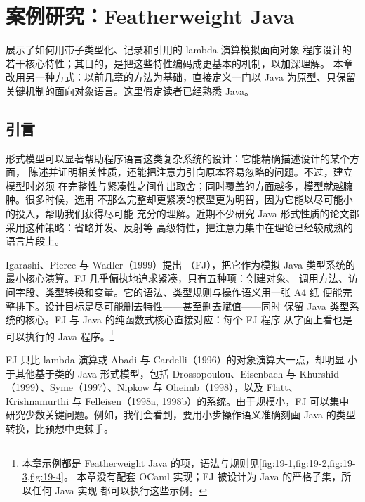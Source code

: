 
\chapter{案例研究：Featherweight Java}
\label{chap:19}

展示了如何用带子类型化、记录和引用的 lambda 演算模拟面向对象
程序设计的若干核心特性；其目的，是把这些特性编码成更基本的机制，以加深理解。
本章改用另一种方式：以前几章的方法为基础，直接定义一门以 Java 为原型、只保留
关键机制的面向对象语言。这里假定读者已经熟悉 Java。

\section{引言}
\label{sec:19.1}

形式模型可以显著帮助程序语言这类复杂系统的设计：它能精确描述设计的某个方面，
陈述并证明相关性质，还能把注意力引向原本容易忽略的问题。不过，建立模型时必须
在完整性与紧凑性之间作出取舍；同时覆盖的方面越多，模型就越臃肿。很多时候，选用
不那么完整却更紧凑的模型更为明智，因为它能以尽可能小的投入，帮助我们获得尽可能
充分的理解。近期不少研究 Java 形式性质的论文都采用这种策略：省略并发、反射等
高级特性，把注意力集中在理论已经较成熟的语言片段上。

Igarashi、Pierce 与 Wadler（1999）提出
（FJ），把它作为模拟
Java 类型系统的最小核心演算。FJ 几乎偏执地追求紧凑，只有五种项：创建对象、
调用方法、访问字段、类型转换和变量。它的语法、类型规则与操作语义用一张 A4 纸
便能完整排下。设计目标是尽可能删去特性——甚至删去赋值——同时
保留 Java 类型系统的核心。FJ 与 Java 的纯函数式核心直接对应：每个 FJ 程序
从字面上看也是可以执行的 Java 程序。\footnote{本章示例都是 Featherweight
Java 的项，语法与规则见\cref{fig:19-1,fig:19-2,fig:19-3,fig:19-4}。
本章没有配套 OCaml 实现；FJ 被设计为 Java 的严格子集，所以任何 Java 实现
都可以执行这些示例。}

FJ 只比 lambda 演算或 Abadi 与 Cardelli（1996）的对象演算大一点，却明显
小于其他基于类的 Java 形式模型，包括 Drossopoulou、Eisenbach 与
Khurshid（1999）、Syme（1997）、Nipkow 与 Oheimb（1998），以及 Flatt、
Krishnamurthi 与 Felleisen（1998a, 1998b）的系统。由于规模小，FJ 可以集中
研究少数关键问题。例如，我们会看到，要用小步操作语义准确刻画 Java 的类型
转换，比预想中更棘手。

